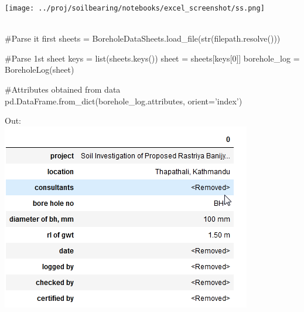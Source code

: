 \texttt{[image: ../proj/soilbearing/notebooks/excel\_screenshot/ss.png]}\\\\

\begin{python}
#Parse it first
sheets = BoreholeDataSheets.load_file(str(filepath.resolve()))
\end{python}

\begin{python}
#Parse 1st sheet
keys = list(sheets.keys())
sheet = sheets[keys[0]]
borehole_log = BoreholeLog(sheet)
\end{python}

\begin{python}
#Attributes obtained from data
pd.DataFrame.from_dict(borehole_log.attributes, orient='index')
\end{python}
Out:\\
\includegraphics[]{./images/sample/fv.png}\\\\

